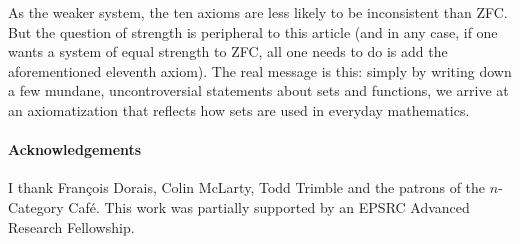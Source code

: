 \documentclass[12pt]{article}
\begin{document}
As the weaker system, the ten axioms are less likely to be inconsistent
than ZFC.  But the question of strength is peripheral to this article (and
in any case, if one wants a system of equal strength to ZFC, all one needs
to do is add the aforementioned eleventh axiom).  The real message is this:
simply by writing down a few mundane, uncontroversial statements about sets
and functions, we arrive at an axiomatization that reflects how sets are
used in everyday mathematics.

\paragraph*{Acknowledgements}
I thank Fran\c{c}ois Dorais, Colin McLarty, Todd Trimble and the patrons of
the $n$-Category Caf\'e.  This work was partially supported by an EPSRC
Advanced Research Fellowship.
\end{document}
